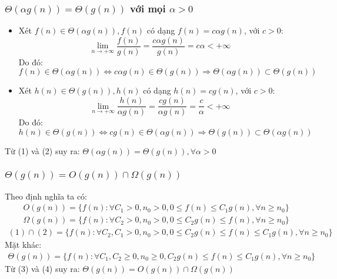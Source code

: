 \subsubsection{$\Theta(\alpha g(n))=\Theta(g(n))$  với mọi $\alpha>0$}
\begin{itemize}
    \item Xét $f(n) \in \Theta(\alpha g(n)), f(n)$ có dạng $f(n) = c \alpha g(n)$, với $c >0$: $$\displaystyle \lim_{n \to +\infty} \frac{f(n)}{g(n)} = \frac{c \alpha g(n)}{g(n)} = c \alpha < +\infty$$
    Do đó: \begin{equation}
        f(n) \in \Theta(\alpha g(n)) \Leftrightarrow c\alpha g(n) \in \Theta(g(n)) \Rightarrow \Theta(\alpha g(n)) \subset \Theta(g(n))
    \end{equation}
    \item Xét $h(n) \in \Theta(g(n)), h(n)$ có dạng $h(n) = c g(n)$, với $c >0$: $$\displaystyle \lim_{n \to +\infty} \frac{h(n)}{\alpha g(n)} = \frac{c g(n)}{\alpha g(n)} = \frac{c}{\alpha} < +\infty$$
    Do đó: \begin{equation}
        h(n) \in \Theta(g(n)) \Leftrightarrow c g(n) \in \Theta(\alpha g(n)) \Rightarrow \Theta(g(n)) \subset \Theta(\alpha g(n))
    \end{equation}
\end{itemize}
Từ (1) và (2) suy ra: $\Theta(\alpha g(n))=\Theta(g(n)), \forall \alpha > 0$
\subsubsection{$\Theta(g(n))=O(g(n))\cap \Omega(g(n))$}
Theo định nghĩa ta có:
\begin{align}
    & O(g(n)) = \{f(n): \forall C_1 > 0, n_0 > 0 ,0 \leq f(n) \leq C_1 g(n), \forall n \geq n_0\} \\
    & \Omega(g(n))=\{f(n):\forall C_2>0,n_0>0,0\leq C_2 g(n) \leq f(n), \forall n\geq n_0\}
\end{align}
\begin{align}
(1) \cap (2) = \{f(n):\forall C_2,C_1>0,n_0>0,0\leq C_2 g(n)\leq f(n)\leq C_1 g(n),\forall n\geq n_0\}
\end{align}
Mặt khác:
\begin{align}
    \Theta(g(n))=\{f(n): \forall C_1, C_2\geq 0,n_0\geq 0,C_2 g(n)\leq f(n)\leq C_1 g(n),\forall n\geq n_0\}
\end{align}
Từ (3) và (4) suy ra: $\Theta(g(n))=O(g(n))\cap \Omega(g(n))$

